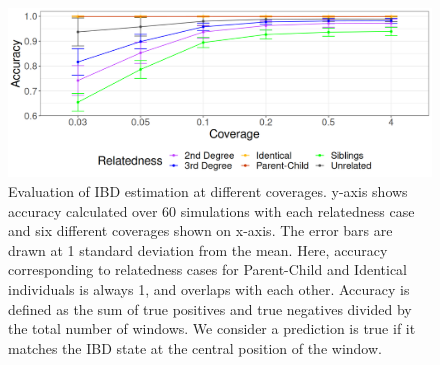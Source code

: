 \documentclass[12pt, letterpaper]{article}
\begin{document}
\begin{figure}[h!]
    \includegraphics[width=16cm]{plots/plotimg/plot_IBDaccuracy.png}
    \centering
    \caption{Evaluation of IBD estimation at different coverages. y-axis shows accuracy calculated over 60 simulations with each relatedness case and six different coverages shown on x-axis. The error bars are drawn at 1 standard deviation from the mean. Here, accuracy corresponding to relatedness cases for Parent-Child and Identical individuals is always 1, and overlaps with each other. Accuracy is defined as the sum of true positives and true negatives divided by the total number of windows. We consider a prediction is true if it matches the IBD state at the central position of the window.}
    \label{fig4:IBDstate_accuracy}
\end{figure}
\end{document}
